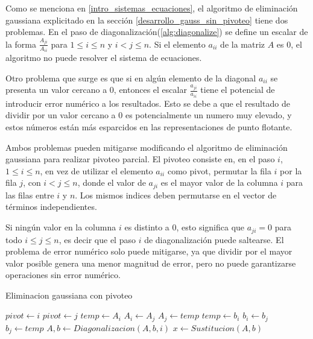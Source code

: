 Como se menciona en \ref{intro_sistemas_ecuaciones}, el algoritmo de eliminación gaussiana explicitado en la sección \ref{desarrollo_gauss_sin_pivoteo} tiene dos problemas. En el paso de diagonalización(\ref{alg:diagonalize}) se define un escalar de la forma $\frac{A_{ji}}{A_{ii}}$ para $1 \leq i \leq n$ y $i < j \leq n$. Si el elemento $a_{ii}$ de la matriz $A$ es $0$, el algoritmo no puede resolver el sistema de ecuaciones.

Otro problema que surge es que si en algún elemento de la diagonal $a_{ii}$ se presenta un valor cercano a $0$, entonces el escalar $\frac{a_{ji}}{a_{ii}}$ tiene el potencial de introducir error numérico a los resultados. Esto se debe a que el resultado de dividir por un valor cercano a $0$ es potencialmente un numero muy elevado, y estos números están más esparcidos en las representaciones de punto flotante.

\smallbreak

Ambos problemas pueden mitigarse modificando el algoritmo de eliminación gaussiana para realizar pivoteo parcial. El pivoteo consiste en, en el paso $i$, $1 \leq i \leq n$, en vez de utilizar el elemento $a_{ii}$ como pivot, permutar la fila $i$ por la fila $j$, con $i < j \leq n$, donde el valor de $a_{ji}$ es el mayor valor de la columna $i$ para las filas entre $i$ y $n$. Los mismos indices deben permutarse en el vector de términos independientes.

\smallbreak

Si ningún valor en la columna $i$ es distinto a $0$, esto significa que $a_{ji} = 0$ para todo $i \leq j \leq n$, es decir que el paso $i$ de diagonalización puede saltearse. El problema de error numérico solo puede mitigarse, ya que dividir por el mayor valor posible genera una menor magnitud de error, pero no puede garantizarse operaciones sin error numérico.

\begin{algorithm}
    \caption{Eliminacion gaussiana con pivoteo}\label{alg:gauss-pivot}
    \begin{algorithmic}
        \State $pivot \gets i$
        \State $pivot \gets j$
        \EndIf
        \EndFor
        \State $temp \gets A_{i}$ 
        \State $A_{i} \gets A_{j}$
        \State $A_{j} \gets temp$
        \State $temp \gets b_{i}$
        \State $b_{i} \gets b_{j}$
        \State $b_{j} \gets temp$
        \EndIf
        \State $A, b \gets Diagonalizacion(A, b, i)$ 
        \EndFor
        \State $x \gets Sustitucion(A,b)$ 
    \end{algorithmic}
\end{algorithm}
